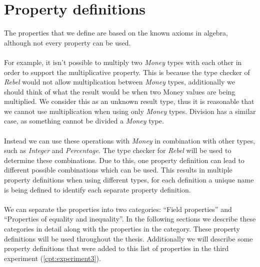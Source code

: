 \section{Property definitions}
\label{sct:properties_property_definitions}
The properties that we define are based on the known axioms in algebra, although
not every property can be used.\\
\\
For example, it isn't possible to multiply two
\textit{Money} types with each other in order to support the multiplicative
property. This is because the type checker of \textit{Rebel} would not allow
multiplication between \textit{Money} types, additionally we should think of
what the result would be when two Money values are being multiplied. We consider
this as an unknown result type, thus it is reasonable that we cannot use
multiplication when using only \textit{Money} types. Division has a similar
case, as something cannot be divided a \textit{Money} type.\\
\\
Instead we can use these operations with \textit{Money} in combination with
other types, such as \textit{Integer} and \textit{Percentage}. The type checker
for \textit{Rebel} will be used to determine these combinations. Due to this,
one property definition can lead to different possible combinations which can be
used. This results in multiple property definitions when using different types,
for each definition a unique name is being defined to identify each separate
property definition.\\
\\
We can separate the properties into two categories: ``Field properties'' and
``Properties of equality and inequality''. In the following sections we describe
these categories in detail along with the properties in the category. These
property definitions will be used throughout the thesis. Additionally we will
describe some property definitions that were added to this list of properties in
the third experiment (\autoref{cpt:experiment3}).

